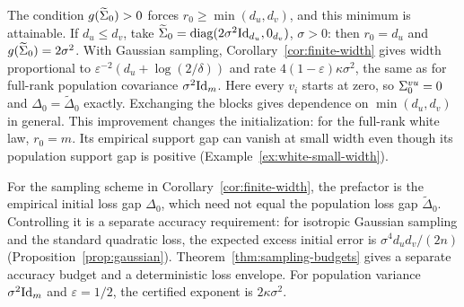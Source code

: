 \begin{remark}\label{rem:rank-adaptive-width}
The condition $g(\widetilde\Sigma_0)>0$ forces $r_0\ge\min(d_u,d_v)$,
and this minimum is attainable. If $d_u\le d_v$, take
$\widetilde\Sigma_0=\operatorname{diag}(2\sigma^2\mathrm{Id}_{d_u},0_{d_v})$, $\sigma>0$:
then $r_0=d_u$ and $g(\widetilde\Sigma_0)=2\sigma^2$.
With Gaussian sampling, Corollary~\ref{cor:finite-width} gives width proportional to
$\varepsilon^{-2}(d_u+\log(2/\delta))$ and rate $4(1-\varepsilon)\kappa\sigma^2$, the same as for full-rank
population covariance $\sigma^2\mathrm{Id}_m$. Here every $v_i$ starts at zero,
so $\Sigma^{vu}_0=0$ and $\Delta_0=\widetilde\Delta_0$ exactly.
Exchanging the blocks gives dependence on $\min(d_u,d_v)$ in general.
This improvement changes the initialization: for the full-rank white law,
$r_0=m$. Its empirical support gap can vanish at small width even though its
population support gap is positive (Example~\ref{ex:white-small-width}).
\end{remark}

For the sampling scheme in Corollary~\ref{cor:finite-width}, the prefactor is
the empirical initial loss gap $\Delta_0$, which need not equal the population
loss gap $\widetilde\Delta_0$. Controlling it is a separate
accuracy requirement: for isotropic Gaussian sampling and the standard quadratic loss,
the expected excess initial error is $\sigma^4d_ud_v/(2n)$
(Proposition~\ref{prop:gaussian}). Theorem~\ref{thm:sampling-budgets}
gives a separate accuracy budget and a deterministic loss envelope.
For population variance $\sigma^2 \mathrm{Id}_m$ and $\varepsilon=1/2$,
the certified exponent is $2\kappa\sigma^2$.

